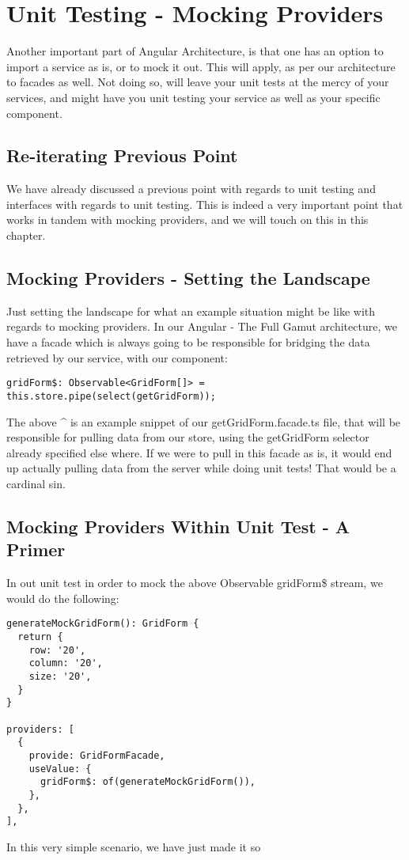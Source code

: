 \maketitle{}
\section{ Unit Testing - Mocking Providers }
Another important part of Angular Architecture, is that one has an option to
import a service as is, or to mock it out. This will apply, as per our
architecture to facades as well. Not doing so, will leave your unit tests at
the mercy of your services, and might have you unit testing your service as
well as your specific component.

\subsection{ Re-iterating Previous Point }
We have already discussed a previous point with regards to unit testing and
interfaces with regards to unit testing. This is indeed a very important point
that works in tandem with mocking providers, and we will touch on this in this
chapter.

\subsection{ Mocking Providers - Setting the Landscape }
Just setting the landscape for what an example situation might be like with
regards to mocking providers. In our Angular - The Full Gamut architecture, we
have a facade which is always going to be responsible for bridging the data
retrieved by our service, with our component:
\begin{lstlisting}
gridForm$: Observable<GridForm[]> = this.store.pipe(select(getGridForm));
\end{lstlisting}

The above ^ is an example snippet of our getGridForm.facade.ts file, that will
be responsible for pulling data from our store, using the getGridForm selector
already specified else where. If we were to pull in this facade as is, it would
end up actually pulling data from the server while doing unit tests! That would
be a cardinal sin.

\subsection{ Mocking Providers Within Unit Test - A Primer }
In out unit test in order to mock the above Observable gridForm\$ stream, we
would do the following:
\begin{lstlisting}
generateMockGridForm(): GridForm {
  return {
    row: '20',
    column: '20',
    size: '20',
  }
}

providers: [
  {
    provide: GridFormFacade,
    useValue: {
      gridForm$: of(generateMockGridForm()),
    },
  },
],
\end{lstlisting}

In this very simple scenario, we have just made it so
